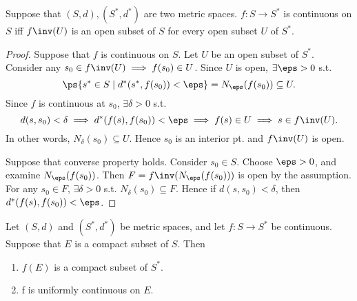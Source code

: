\documentclass[11pt]{scrartcl}
\numberwithin{equation}{section}
\begin{document}
\begin{theorem}
    Suppose that $(S,d), (S^*, d^*)$ are two metric spaces.
    $f: S\to S^*$ is continuous on $S$ iff 
    $f\inv(U)$ is an open subset of $S$ for every open subset $U$ 
    of $S^*$.
\end{theorem}

\begin{proof}
    Suppose that $f$ is continuous on $S$. Let $U$ be an open 
    subset of $S^*$. Consider any $s_0 \in f\inv(U) \implies 
    f(s_0)\in U$. Since $U$ is open, $\exists \eps>0$ s.t. 
    \[
        \ps{s^*\in S\mid d^*(s^*, f(s_0))<\eps} = N_\eps(f(s_0)) 
        \subseteq U.
    \]
    Since $f$ is continuous at $s_0$, $\exists \delta>0$ s.t. 
    \[
        d(s,s_0) < \delta \implies d^*(f(s),f(s_0)) < \eps \implies f(s) \in U \implies s\in f\inv(U).
    \]
    In other words, $N_\delta(s_0) \subseteq U$. Hence $s_0$ is 
    an interior pt. and $f\inv(U)$ is open.

    Suppose that converse property holds. 
    Consider $s_0\in S$. Choose $\eps>0$, and examine
    $N_\eps(f(s_0))$. Then $F = f\inv(N_\eps(f(s_0)))$ is open 
    by the assumption. For any $s_0\in F$, $\exists \delta>0$ s.t. 
    $N_\delta(s_0) \subseteq F$. Hence if $d(s,s_0) < \delta$, then 
    $d^*(f(s),f(s_0)) < \eps$.
\end{proof}

\begin{theorem}
    Let $(S,d)$ and $(S^*,d^*)$ be metric spaces, and let 
    $f : S \rightarrow S^*$ be continuous. Suppose that $E$ is a 
    compact subset of $S$. Then 
    \begin{enumerate}
        \item $f(E)$ is a compact subset of $S^*$.
        \item f is uniformly continuous on $E$.
    \end{enumerate}
\end{theorem}
\end{document}
